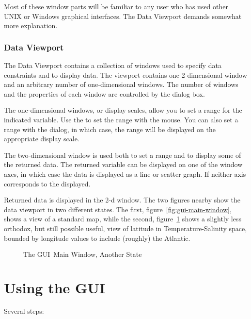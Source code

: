 \documentclass[10pt]{report}
\newcommand{\gui}{GUI}
\begin{document}
\noindent Most of these window parts will be familiar to any user who 
has used other UNIX or Windows graphical interfaces.  The Data
Viewport demands somewhat more explanation.

\subsubsection{Data Viewport}
\label{sec:window:viewport}

The Data Viewport contains a collection of windows used to specify
data constraints and to display data.  The viewport contains one
2-dimensional window and an arbitrary number of one-dimensional
windows.  The number of windows and the properties of each window are
controlled by the  dialog box.  

The one-dimensional windows, or display scales, allow you to set a
range for the indicated variable.  Use the  to set the range with the mouse.  You can also set a range
with the  dialog, in which case, the range will
be displayed on the appropriate display scale.

The two-dimensional window is used both to set a range and to display
some of the returned data.  The returned variable can be displayed on
one of the window axes, in which case the data is displayed as a line
or scatter graph. If neither axis corresponds to the displayed.

Returned data is displayed in the 2-d window.  The two figures nearby
show the data viewport in two different states.  The first,
figure~\ref{fig:gui-main-window}, shows a view of a standard map,
while the second, figure~\ref{fig:gui-main-window-alt} shows a
slightly less orthodox, but still possible useful, view of latitude in
Temperature-Salinity space, bounded by longitude values to include
(roughly) the Atlantic.

\begin{figure}[htbp] 
\centerline{}
\caption{The \gui\ Main Window, Another State}
\label{fig:gui-main-window-alt}
\end{figure}

\section{Using the GUI}
\label{sec:using-GUI}

Several steps:
\end{document}
